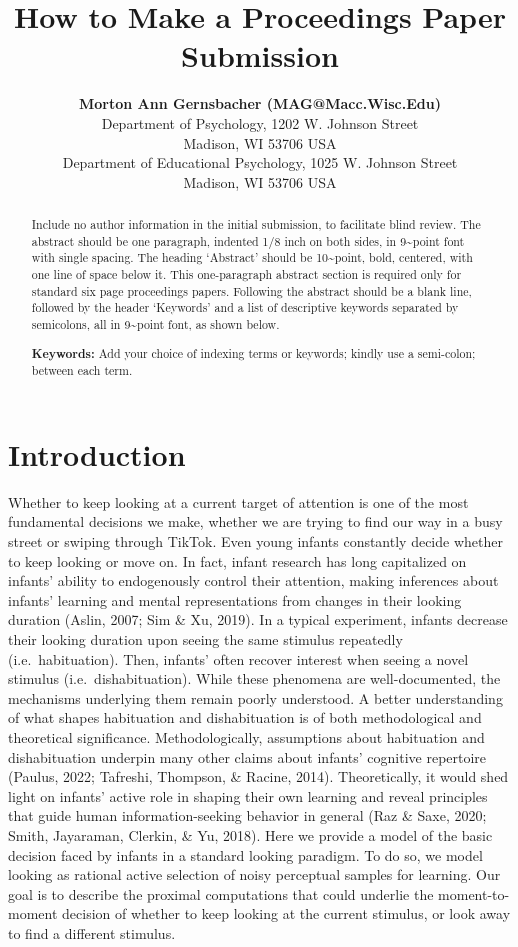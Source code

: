 \documentclass[10pt, letterpaper]{article}
\title{How to Make a Proceedings Paper Submission}
\author{{\large \bf Morton Ann Gernsbacher (MAG@Macc.Wisc.Edu)} \\ Department of Psychology, 1202 W. Johnson Street \\ Madison, WI 53706 USA \AND {\large \bf Sharon J.~Derry (SDJ@Macc.Wisc.Edu)} \\ Department of Educational Psychology, 1025 W. Johnson Street \\ Madison, WI 53706 USA}
\begin{document}
\maketitle

\begin{abstract}
Include no author information in the initial submission, to facilitate
blind review. The abstract should be one paragraph, indented 1/8 inch on
both sides, in 9\textasciitilde point font with single spacing. The
heading `Abstract' should be 10\textasciitilde point, bold, centered,
with one line of space below it. This one-paragraph abstract section is
required only for standard six page proceedings papers. Following the
abstract should be a blank line, followed by the header `Keywords' and a
list of descriptive keywords separated by semicolons, all in
9\textasciitilde point font, as shown below.

\textbf{Keywords:}
Add your choice of indexing terms or keywords; kindly use a semi-colon;
between each term.
\end{abstract}

\hypertarget{introduction}{%
\section{Introduction}\label{introduction}}

Whether to keep looking at a current target of attention is one of the
most fundamental decisions we make, whether we are trying to find our
way in a busy street or swiping through TikTok. Even young infants
constantly decide whether to keep looking or move on. In fact, infant
research has long capitalized on infants' ability to endogenously
control their attention, making inferences about infants' learning and
mental representations from changes in their looking duration (Aslin,
2007; Sim \& Xu, 2019). In a typical experiment, infants decrease their
looking duration upon seeing the same stimulus repeatedly
(i.e.~habituation). Then, infants' often recover interest when seeing a
novel stimulus (i.e.~dishabituation). While these phenomena are
well-documented, the mechanisms underlying them remain poorly
understood. A better understanding of what shapes habituation and
dishabituation is of both methodological and theoretical significance.
Methodologically, assumptions about habituation and dishabituation
underpin many other claims about infants' cognitive repertoire (Paulus,
2022; Tafreshi, Thompson, \& Racine, 2014). Theoretically, it would shed
light on infants' active role in shaping their own learning and reveal
principles that guide human information-seeking behavior in general (Raz
\& Saxe, 2020; Smith, Jayaraman, Clerkin, \& Yu, 2018). Here we provide
a model of the basic decision faced by infants in a standard looking
paradigm. To do so, we model looking as rational active selection of
noisy perceptual samples for learning. Our goal is to describe the
proximal computations that could underlie the moment-to-moment decision
of whether to keep looking at the current stimulus, or look away to find
a different stimulus.
\end{document}
